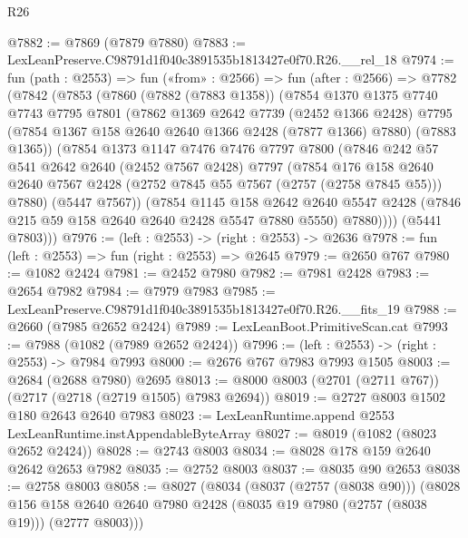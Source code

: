 \begin{lexlean}{R26}
\begin{coremodule}
@7882 := @7869 (@7879 @7880)
@7883 := LexLeanPreserve.C98791d1f040c3891535b1813427e0f70.R26.__rel_18
@7974 := fun (path : @2553) =>
  fun («from» : @2566) =>
  fun (after : @2566) =>
  @7782
    (@7842
      (@7853
        (@7860
          (@7882 (@7883 @1358))
          (@7854
            @1370
            @1375
            @7740
            @7743
            @7795
            @7801
            (@7862
              @1369
              @2642
              @7739
              (@2452 @1366 @2428)
              @7795
              (@7854 @1367 @158 @2640 @2640 @1366 @2428 (@7877 @1366) @7880)
              (@7883 @1365))
            (@7854
              @1373
              @1147
              @7476
              @7476
              @7797
              @7800
              (@7846
                @242
                @57
                @541
                @2642
                @2640
                (@2452 @7567 @2428)
                @7797
                (@7854
                  @176
                  @158
                  @2640
                  @2640
                  @7567
                  @2428
                  (@2752 @7845 @55 @7567 (@2757 (@2758 @7845 @55)))
                  @7880)
                (@5447 @7567))
              (@7854
                @1145
                @158
                @2642
                @2640
                @5547
                @2428
                (@7846 @215 @59 @158 @2640 @2640 @2428 @5547 @7880 @5550)
                @7880))))
        (@5441 @7803)))
@7976 := (left : @2553) -> (right : @2553) -> @2636
@7978 := fun (left : @2553) => fun (right : @2553) => @2645
@7979 := @2650 @767
@7980 := @1082 @2424
@7981 := @2452 @7980
@7982 := @7981 @2428
@7983 := @2654 @7982
@7984 := @7979 @7983
@7985 := LexLeanPreserve.C98791d1f040c3891535b1813427e0f70.R26.__fits_19
@7988 := @2660 (@7985 @2652 @2424)
@7989 := LexLeanBoot.PrimitiveScan.cat
@7993 := @7988 (@1082 (@7989 @2652 @2424))
@7996 := (left : @2553) -> (right : @2553) -> @7984 @7993
@8000 := @2676 @767 @7983 @7993 @1505
@8003 := @2684 (@2688 @7980) @2695
@8013 := @8000 @8003 (@2701 (@2711 @767)) (@2717 (@2718 (@2719 @1505) @7983 @2694))
@8019 := @2727 @8003 @1502 @180 @2643 @2640 @7983
@8023 := LexLeanRuntime.append @2553 LexLeanRuntime.instAppendableByteArray
@8027 := @8019 (@1082 (@8023 @2652 @2424))
@8028 := @2743 @8003
@8034 := @8028 @178 @159 @2640 @2642 @2653 @7982
@8035 := @2752 @8003
@8037 := @8035 @90 @2653
@8038 := @2758 @8003
@8058 := @8027
    (@8034
      (@8037 (@2757 (@8038 @90)))
      (@8028 @156 @158 @2640 @2640 @7980 @2428 (@8035 @19 @7980 (@2757 (@8038 @19))) (@2777 @8003)))

\end{coremodule}
\end{lexlean}
